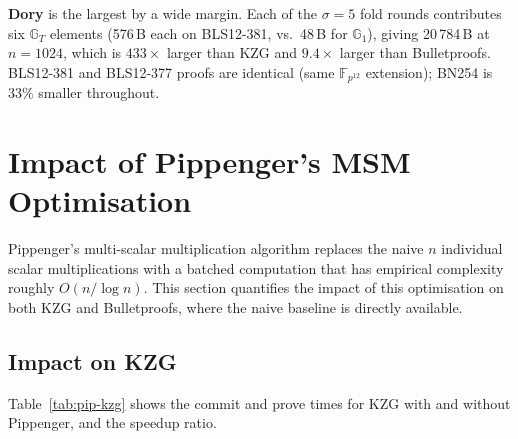 \textbf{Dory} is the largest by a wide margin. Each of the
$\sigma = 5$ fold rounds contributes six $\mathbb{G}_T$ elements
(576\,B each on BLS12-381, vs.\ 48\,B for $\mathbb{G}_1$), giving
20\,784\,B at $n=1024$, which is $433\times$ larger than KZG and
$9.4\times$ larger than Bulletproofs. BLS12-381 and BLS12-377 proofs
are identical (same $\mathbb{F}_{p^{12}}$ extension); BN254 is
$33\%$ smaller throughout.

\section{Impact of Pippenger's MSM Optimisation}
\label{sec:pippenger-comparison}

Pippenger's multi-scalar multiplication algorithm replaces the naive
$n$ individual scalar multiplications with a batched computation that
has empirical complexity roughly $O(n / \log n)$. This section
quantifies the impact of this optimisation on both KZG and
Bulletproofs, where the naive baseline is directly available.

\subsection{Impact on KZG}

Table~\ref{tab:pip-kzg} shows the commit and prove times for KZG with
and without Pippenger, and the speedup ratio.

\begin{table}[H]
\centering
\caption{Pippenger speedup for KZG commit and prove time on BLS12-381.}
\label{tab:pip-kzg}
%
\end{table}

